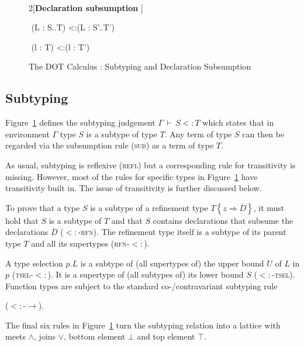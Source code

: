 \documentclass{llncs}
\newif\ifdep\depfalse
\newcommand{\linesep}{\ \hrulefill \ \smallskip}
\renewcommand{\ts}{\,\vdash\,}
\newcommand{\spcomma}{~,~}
\newcommand{\sub}{<:}
\newcommand{\tfun}{\rightarrow}
\newcommand{\tand}{\wedge}
\newcommand{\tor}{\vee}
\newcommand{\sing}{.\textbf{type}}
\newcommand{\judgement}[2]{{\bf #1} \hfill #2}
\newcommand{\refine}[2]{\left\{#1 \Rightarrow #2 \right\}}
\newcommand{\seq}[1]{\overline{#1}}
\newcommand{\Ldecl}[3]{#1 : #2..#3}%
\newcommand{\ldecl}[2]{#1 : #2}
\newcommand{\Top}{\top}%
\newcommand{\Bot}{\bot}%
\begin{document}
\begin{figure}
{    \linesep

    \begin{multicols}{2}[\judgement{Declaration subsumption}{\fbox{$\Gamma \ts D \sub D'$}}]

    \infrule[\textsc{tdecl-$\sub$}]
            {\Gamma \ts S' \sub S \spcomma T \sub T'}
            {\Gamma \ts (\Ldecl L S T) \sub (\Ldecl L {S'} {T'})}

    \infrule[\textsc{vdecl-$\sub$}]
            {\Gamma \ts T \sub T'}
            {\Gamma \ts (\ldecl l T) \sub (\ldecl l {T'})}

    \end{multicols}
  }
\caption{The DOT Calculus : Subtyping and Declaration Subsumption}\label{dot-sub}
\end{figure}


\subsection*{Subtyping}

Figure~\ref{dot-sub} defines the subtyping judgement $\Gamma \ts S
\sub T$ which states that in environment $\Gamma$ type $S$ is a
subtype of type $T$.  Any term of type $S$ can then be regarded via
the subsumption rule (\textsc{sub}) as a term of type $T$.

As usual, subtyping is reflexive (\textsc{refl}) but a corresponding
rule for transitivity is missing.  However, most of the rules for
specific types in Figure~\ref{dot-sub} have transitivity built in. The
issue of transitivity is further discussed below.

To prove that a type $S$ is a subtype of a refinement type $T \refine
z {\seq D}$, it must hold that $S$ is a subtype of $T$ and that $S$
contains declarations that subsume the declarations $\seq D$
(\textsc{$\sub$-rfn}). The refinement type itself is a subtype of its
parent type $T$ and all its supertypes (\textsc{rfn-$\sub$}).

A type selection $p.L$ is a subtype of (all supertypes of) the upper bound $U$ of
$L$ in $p$ (\textsc{tsel-$\sub$}).
It is a supertype of (all subtypes of) its lower
bound $S$ (\textsc{$\sub$-tsel}).  Function types are subject to the
standard co-/contravariant subtyping rule 
\ifdep
 (\textsc{$\sub$-$\Rightarrow$}).
\else
  (\textsc{$\sub$-$\tfun$}).
\fi
The final six rules in
Figure~\ref{dot-sub} turn the subtyping relation into a lattice with 
meets $\tand$, joins $\tor$, bottom element $\Bot$ and top element $\Top$.
\end{document}
